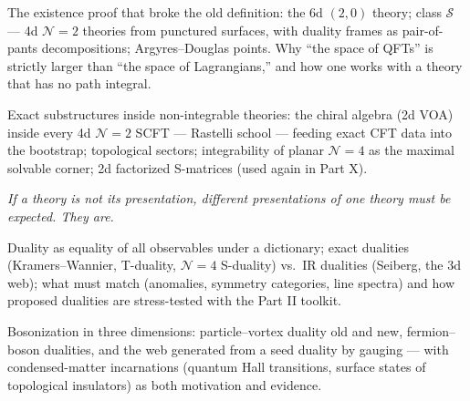 The existence proof that broke the old definition: the 6d $(2,0)$ theory; class $\mathcal{S}$ --- 4d $\mathcal{N}=2$ theories from punctured surfaces, with duality frames as pair-of-pants decompositions; Argyres--Douglas points. Why ``the space of QFTs'' is strictly larger than ``the space of Lagrangians,'' and how one works with a theory that has no path integral.

Exact substructures inside non-integrable theories: the chiral algebra (2d VOA) inside every 4d $\mathcal{N}=2$ SCFT --- Rastelli school --- feeding exact CFT data into the bootstrap; topological sectors; integrability of planar $\mathcal{N}=4$ as the maximal solvable corner; 2d factorized S-matrices (used again in Part X).


\noin \emph{If a theory is not its presentation, different presentations of one theory must be expected. They are.}

Duality as equality of all observables under a dictionary; exact dualities (Kramers--Wannier, T-duality, $\mathcal{N}=4$ S-duality) vs.\ IR dualities (Seiberg, the 3d web); what must match (anomalies, symmetry categories, line spectra) and how proposed dualities are stress-tested with the Part II toolkit.

Bosonization in three dimensions: particle--vortex duality old and new, fermion--boson dualities, and the web generated from a seed duality by gauging --- with condensed-matter incarnations (quantum Hall transitions, surface states of topological insulators) as both motivation and evidence.

